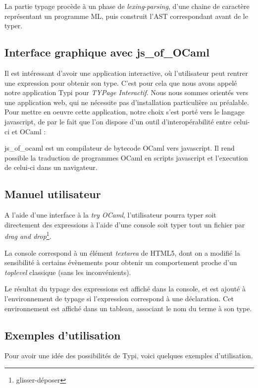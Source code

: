 \documentclass[a4paper, 11pt]{article}
\begin{document}
La partie typage procède à un phase de \emph{lexing}-\emph{parsing}, d'une chaine de caractère représentant un programme ML, puis construit l'AST correspondant avant de le typer.

\subsection{Interface graphique avec js\_of\_OCaml}

Il est intéressant d'avoir une application interactive, où l'utilisateur peut rentrer une expression pour obtenir son type.
C'est pour cela que nous avons appelé notre application Typi pour \emph{TYPage Interactif}.
Nous nous sommes orientés vers une application web, qui ne nécessite pas d'installation particulière au préalable. Pour mettre en oeuvre cette application, notre choix s'est porté vers le langage javascript, de par le fait que l'on dispose d'un outil d'interopérabilité entre celui-ci et OCaml :

js\_of\_ocaml est un compilateur de bytecode OCaml vers javascript. Il rend possible la traduction de programmes OCaml en scripts javascript et l'execution de celui-ci dans un navigateur.

\subsection{Manuel utilisateur}

A l'aide d'une interface à la \emph{try OCaml}, l'utilisateur pourra typer soit directement des expressions à l'aide d'une console soit typer tout un fichier par \emph{drag and drop}\footnote{glisser-déposer}.

La console correspond à un élément \emph{textarea} de HTML5, dont on a modifié la sensibilité à certains évènements pour obtenir un comportement proche d'un \emph{toplevel} classique (sans les inconvénients).

Le résultat du typage des expressions est affiché dans la console, et est ajouté à l'environnement de typage si l'expression correspond à une déclaration. Cet environnement est affiché dans un tableau, associant le nom du terme à son type.





\subsection{Exemples d'utilisation}

Pour avoir une idée des possibilités de Typi, voici quelques exemples d'utilisation.
\end{document}
